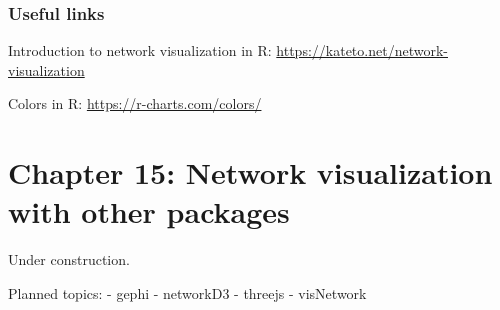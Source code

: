 \documentclass[
]{book}
\begin{document}
\subsection{Useful links}\label{useful-links}

Introduction to network visualization in R: \url{https://kateto.net/network-visualization}

Colors in R: \url{https://r-charts.com/colors/}

\chapter{Chapter 15: Network visualization with other packages}\label{ch15}

Under construction.

Planned topics:
- gephi
- networkD3
- threejs
- visNetwork

  
\end{document}
